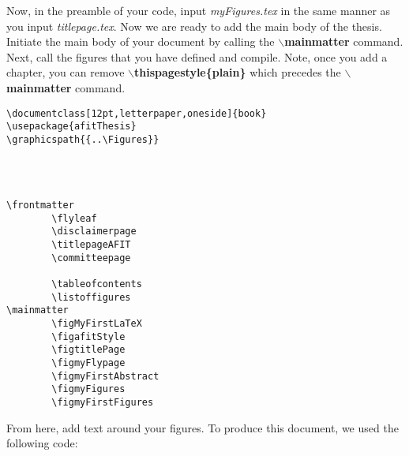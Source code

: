 
Now, in the preamble of your code, input {\em myFigures.tex} in the
same manner as you input {\em titlepage.tex}.  Now we are ready to add
the main body of the thesis.  Initiate the main body of your document
by calling the {\bf$\backslash$mainmatter} command.  Next, call the
figures that you have defined and compile.  Note, once you add a
chapter, you can remove {\bf$\backslash$thispagestyle\{plain\}} which
precedes the {\bf$\backslash$mainmatter} command.

\vspace{-0.3in}
{\singlespace
\begin{verbatim}
\documentclass[12pt,letterpaper,oneside]{book}
\usepackage{afitThesis}
\graphicspath{{..\Figures}}




\frontmatter
        \flyleaf                        
        \disclaimerpage                 
        \titlepageAFIT                      
        \committeepage  	
        
        \tableofcontents
        \listoffigures
\mainmatter
        \figMyFirstLaTeX
        \figafitStyle
        \figtitlePage
        \figmyFlypage
        \figmyFirstAbstract
        \figmyFigures
        \figmyFirstFigures

\end{verbatim}
}
\vspace{-0.1in}

From here, add text around your figures.  To produce this document, we
used the following code:

